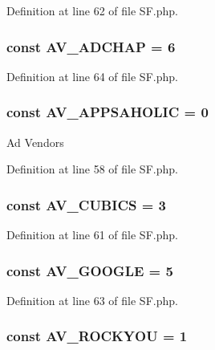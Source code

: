 Definition at line 62 of file SF.php.

\hypertarget{classSF_a227697c7a52e24a3c120f707e9e9b077}{
\subsubsection[{AV\_\-ADCHAP}]{\setlength{\rightskip}{0pt plus 5cm}const {\bf AV\_\-ADCHAP} = 6}}
\label{classSF_a227697c7a52e24a3c120f707e9e9b077}


Definition at line 64 of file SF.php.

\hypertarget{classSF_ab7242b4b78720ce32da2389d93512434}{
\subsubsection[{AV\_\-APPSAHOLIC}]{\setlength{\rightskip}{0pt plus 5cm}const {\bf AV\_\-APPSAHOLIC} = 0}}
\label{classSF_ab7242b4b78720ce32da2389d93512434}
Ad Vendors 

Definition at line 58 of file SF.php.

\hypertarget{classSF_aed83d2256a6d5946f1281003404608e0}{
\subsubsection[{AV\_\-CUBICS}]{\setlength{\rightskip}{0pt plus 5cm}const {\bf AV\_\-CUBICS} = 3}}
\label{classSF_aed83d2256a6d5946f1281003404608e0}


Definition at line 61 of file SF.php.

\hypertarget{classSF_a47306753d55c09f27103e559354263ae}{
\subsubsection[{AV\_\-GOOGLE}]{\setlength{\rightskip}{0pt plus 5cm}const {\bf AV\_\-GOOGLE} = 5}}
\label{classSF_a47306753d55c09f27103e559354263ae}


Definition at line 63 of file SF.php.

\hypertarget{classSF_a0ad6babe9e135118c3e70340a7a9c156}{
\subsubsection[{AV\_\-ROCKYOU}]{\setlength{\rightskip}{0pt plus 5cm}const {\bf AV\_\-ROCKYOU} = 1}}
\label{classSF_a0ad6babe9e135118c3e70340a7a9c156}


